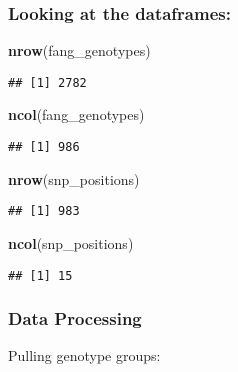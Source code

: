 \documentclass[
]{article}
\newenvironment{Shaded}{\begin{snugshade}}{\end{snugshade}}
\newcommand{\KeywordTok}[1]{\textcolor[rgb]{0.13,0.29,0.53}{\textbf{#1}}}
\newcommand{\NormalTok}[1]{#1}
\begin{document}
\hypertarget{looking-at-the-dataframes}{%
\subsubsection{Looking at the
dataframes:}\label{looking-at-the-dataframes}}

\begin{Shaded}
\begin{Highlighting}[]
\KeywordTok{nrow}\NormalTok{(fang_genotypes)}
\end{Highlighting}
\end{Shaded}

\begin{verbatim}
## [1] 2782
\end{verbatim}

\begin{Shaded}
\begin{Highlighting}[]
\KeywordTok{ncol}\NormalTok{(fang_genotypes)}
\end{Highlighting}
\end{Shaded}

\begin{verbatim}
## [1] 986
\end{verbatim}

\begin{Shaded}
\begin{Highlighting}[]
\KeywordTok{nrow}\NormalTok{(snp_positions)}
\end{Highlighting}
\end{Shaded}

\begin{verbatim}
## [1] 983
\end{verbatim}

\begin{Shaded}
\begin{Highlighting}[]
\KeywordTok{ncol}\NormalTok{(snp_positions)}
\end{Highlighting}
\end{Shaded}

\begin{verbatim}
## [1] 15
\end{verbatim}

\hypertarget{data-processing}{%
\subsubsection{Data Processing}\label{data-processing}}

Pulling genotype groups:
\end{document}
